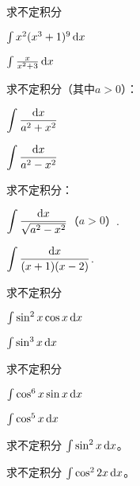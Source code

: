 \documentclass[14pt,notheorems,leqno,xcolor={rgb}]{beamer} %
\begin{document}
\begin{frame}
\begin{exercise}
求不定积分
\begin{enumlite}
  \item $\int x^2(x^3+1)^9\mathop{}\!\mathrm{d}{x}$
  \item $\int \frac{x}{x^2+3}\mathop{}\!\mathrm{d}{x}$
\end{enumlite}
\end{exercise}
\end{frame}

\begin{frame}
\begin{example}
求不定积分（其中$a>0$）：
\begin{enumlite}
  \item $\displaystyle\int \dfrac{\mathop{}\!\mathrm{d}{x}}{a^2+x^2}$
  \item $\displaystyle\int \dfrac{\mathop{}\!\mathrm{d}{x}}{a^2-x^2}$
\end{enumlite}
\end{example}
\pause
\begin{exercise}
求不定积分：
\begin{enumlite}
  \item $\displaystyle\int \dfrac{\mathop{}\!\mathrm{d}{x}}{\sqrt{a^2-x^2}}$（$a>0$）.
  \pause
  \item $\displaystyle\int \dfrac{\mathop{}\!\mathrm{d}{x}}{(x+1)(x-2)}$.
\end{enumlite}
\end{exercise}
\end{frame}

\begin{frame}
\begin{example}
求不定积分
\begin{enumlite}
  \item $\int \sin^2x\cos x \mathop{}\!\mathrm{d}{x}$
  \item $\int \sin^3 x \mathop{}\!\mathrm{d}{x}$
\end{enumlite}
\end{example}
\vpause
\begin{exercise}
求不定积分
\begin{enumlite}
  \item $\int \cos^6x \sin x \mathop{}\!\mathrm{d}{x}$
  \item $\int \cos^5x \mathop{}\!\mathrm{d}{x}$
\end{enumlite}
\end{exercise}
\end{frame}

\begin{frame}
\begin{example}
求不定积分 $\int \sin^2x \mathop{}\!\mathrm{d}{x}$。
\end{example}
\vpause
\begin{exercise}
求不定积分 $\int \cos^2 2x \mathop{}\!\mathrm{d}{x}$。
\end{exercise}
\end{frame}
\end{document}
